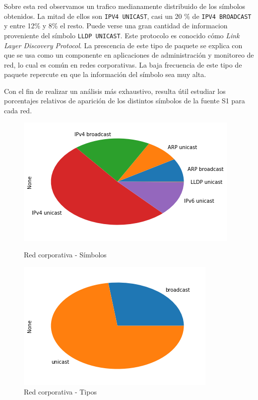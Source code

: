 Sobre esta red observamos un trafico medianamente distribuido de los símbolos obtenidos. La mitad de ellos son \texttt{IPV4 UNICAST}, casi un 20 \% de \texttt{IPV4 BROADCAST} y entre 12\% y 8\% el resto. Puede verse una gran cantidad de informacion proveniente del símbolo \texttt{LLDP UNICAST}. Este protocolo es conocido cómo \textit{Link Layer Discovery Protocol}. La prescencia de este tipo de paquete se explica con que se usa como un componente en aplicaciones de administración y monitoreo de red, lo cual es común en redes corporativas. La baja frecuencia de este tipo de paquete repercute en que la información del símbolo sea muy alta.

Con el fin de realizar un análisis más exhaustivo, resulta útil estudiar los porcentajes relativos de aparición de los distintos símbolos de la fuente S1 para cada red.

\begin{figure}[H]
	\begin{minipage}{0.49\textwidth}
		\centering
		\includegraphics[width=\linewidth]{imagenes/despegar_torta_simbolos}
		\caption{Red corporativa - Símbolos}
		\label{despe_torta_simb}
	\end{minipage}
	\begin{minipage}{0.49\textwidth}
		\centering
		\includegraphics[width=\linewidth]{imagenes/despegar_torta_tipos}
		\caption{Red corporativa - Tipos}
		\label{despe_torta_tipos}
	\end{minipage}
\end{figure}


